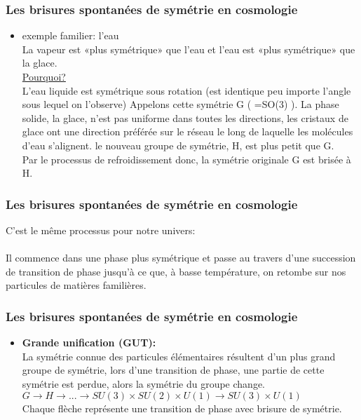 \documentclass{beamer}
\begin{document}
\begin{frame}
\frametitle{Les brisures spontanées de symétrie en cosmologie}
\begin{itemize}
  \item exemple familier: l'eau\\
        La vapeur est «plus symétrique» que l'eau et l'eau est «plus symétrique» que la glace.\\
        \underline{Pourquoi?}\\
        L'eau liquide est symétrique sous rotation (est identique peu importe l'angle sous lequel on l'observe) Appelons cette symétrie G ( =SO(3) ). La phase solide, la glace, n'est pas uniforme dans toutes les directions, les cristaux de glace ont une direction préférée sur le réseau le long de laquelle les molécules d'eau s'alignent. le nouveau groupe de symétrie, H, est plus petit que G. \\
        Par le processus de refroidissement donc, la symétrie originale G est brisée à H.
\end{itemize}
\end{frame}

\begin{frame}
\frametitle{Les brisures spontanées de symétrie en cosmologie}
C'est le même processus pour notre univers: \\
~~\\
Il commence dans une phase plus symétrique et passe au travers d'une succession de transition de phase jusqu'à ce que, à basse température, on retombe sur nos particules de matières familières.
\end{frame}



\begin{frame}
\frametitle{Les brisures spontanées de symétrie en cosmologie}
\begin{itemize}
\item \textbf{Grande unification (GUT):}\\
La symétrie connue des particules élémentaires résultent d'un plus grand groupe de symétrie, lors d'une transition de phase, une partie de cette symétrie est perdue, alors la symétrie du groupe change.\\
$G \rightarrow H \rightarrow...\rightarrow SU(3)\times SU(2)\times U(1)\rightarrow SU(3)\times U(1)$\\
Chaque flèche représente une transition de phase avec brisure de symétrie.\\
\end{itemize}
\end{frame}
\end{document}
